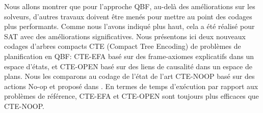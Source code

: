 Nous allons montrer que pour l'approche QBF, au-delà des améliorations sur les solveurs, d'autres travaux doivent être menés pour mettre au point des codages plus performants. Comme nous l'avons indiqué plus haut, cela a été réalisé pour SAT avec des améliorations significatives. Nous présentons ici deux nouveaux codages d'arbres compacts CTE (Compact Tree Encoding) de problèmes de planification en QBF: CTE-EFA basé sur des frame-axiomes explicatifs dans un espace d'états, et CTE-OPEN basé sur des liens de causalité dans un espace de plans.  Nous les comparons au codage de l'état de l'art CTE-NOOP basé sur des actions No-op et proposé dans \cite{DBLP:conf/ecai/CashmoreFG12}. En termes de temps d'exécution par rapport aux problèmes de référence, CTE-EFA et CTE-OPEN sont toujours plus efficaces que CTE-NOOP.







